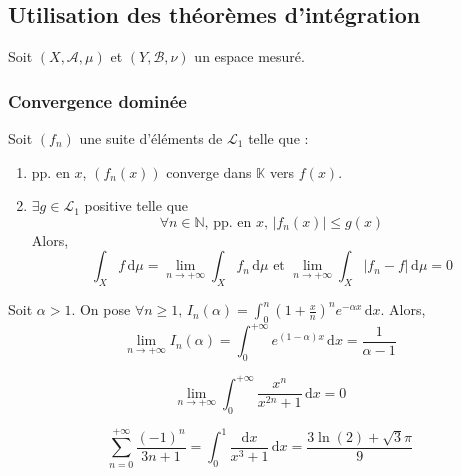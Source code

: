 	\subsection{Utilisation des théorèmes d'intégration}

	Soit $(X, \mathcal{A}, \mu)$ et $(Y, \mathcal{B}, \nu)$ un espace mesuré.

	\subsubsection{Convergence dominée}


	\begin{theorem}
		Soit $(f_n)$ une suite d'éléments de $\mathcal{L}_1$ telle que :
		\begin{enumerate}[label=(\roman*)]
			\item pp. en $x$, $(f_n(x))$ converge dans $\mathbb{K}$ vers $f(x)$.
			\item $\exists g \in \mathcal{L}_1$ positive telle que
			\[ \forall n \in \mathbb{N}, \, \text{pp. en } x, \, \vert f_n(x) \vert \leq g(x) \]
			Alors,
			\[ \int_X f \, \mathrm{d}\mu = \lim_{n \rightarrow +\infty} \int_X f_n \, \mathrm{d}\mu \text{ et } \lim_{n \rightarrow +\infty} \int_X \vert f_n - f \vert \, \mathrm{d}\mu = 0 \]
		\end{enumerate}
	\end{theorem}

	\begin{example}
		Soit $\alpha > 1$. On pose $\forall n \geq 1, \, I_n(\alpha) = \int_0^n \left( 1 + \frac{x}{n} \right)^n e^{-\alpha x} \, \mathrm{d}x$. Alors,
		\[ \lim_{n \rightarrow +\infty} I_n(\alpha) = \int_0^{+\infty} e^{(1-\alpha)x} \, \mathrm{d}x = \frac{1}{\alpha - 1} \]
	\end{example}


	\begin{example}
		\[ \lim_{n \rightarrow +\infty} \int_{0}^{+\infty} \frac{x^n}{x^{2n} + 1} \, \mathrm{d}x = 0 \]
	\end{example}


	\begin{example}
		\[ \sum_{n=0}^{+\infty} \frac{(-1)^n}{3n+1} = \int_0^1 \frac{\mathrm{d}x}{x^3 + 1} \, \mathrm{d}x = \frac{3\ln(2) + \sqrt{3}\pi}{9} \]
	\end{example}

